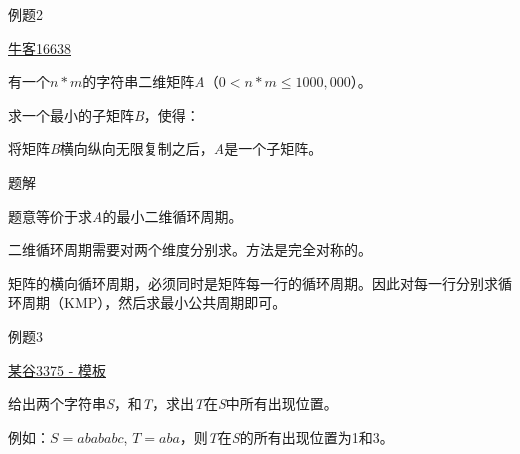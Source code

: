 \documentclass{ctexbeamer}		%
\begin{document}
\begin{frame}{例题2}
    
\begin{block}{\href{https://ac.nowcoder.com/acm/problem/16638}{牛客16638}}

有一个$n * m$的字符串二维矩阵\textit{A}（$0 < n * m \leq 1000,000$）。

求一个最小的子矩阵\textit{B}，使得：

将矩阵\textit{B}横向纵向无限复制之后，\textit{A}是一个子矩阵。

\end{block}

\pause

\begin{block}{题解}

题意等价于求\textit{A}的最小二维循环周期。

\pause

二维循环周期需要对两个维度分别求。方法是完全对称的。

\pause

矩阵的横向循环周期，必须同时是矩阵每一行的循环周期。因此对每一行分别求循环周期（KMP），然后求最小公共周期即可。

\end{block}

\end{frame}



\begin{frame}{例题3}

\begin{block}{\href{https://www.luogu.com.cn/problem/P3375}{某谷3375 - 模板}}

给出两个字符串\textit{S}，和\textit{T}，求出\textit{T}在\textit{S}中所有出现位置。

\hphantom{}

例如：$S = abababc$, $T = aba$，则\textit{T}在\textit{S}的所有出现位置为1和3。

\end{block}

\end{frame}
\end{document}
